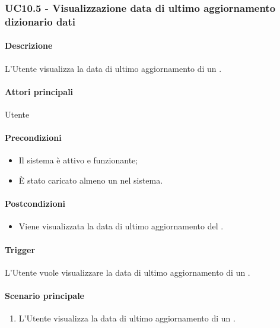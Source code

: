 
\subsubsection{UC10.5 - Visualizzazione data di ultimo aggiornamento dizionario dati}\label{UC10point5}
\paragraph*{Descrizione}
L'Utente visualizza la data di ultimo aggiornamento di un .

\paragraph*{Attori principali}
Utente

\paragraph*{Precondizioni}
\begin{itemize}
  \item Il sistema è attivo e funzionante;
  \item È stato caricato almeno un  nel sistema. 
\end{itemize}

\paragraph*{Postcondizioni}
\begin{itemize}
  \item Viene visualizzata la data di ultimo aggiornamento del .
\end{itemize}

\paragraph*{Trigger}
L'Utente vuole visualizzare la data di ultimo aggiornamento di un .

\paragraph*{Scenario principale}
\begin{enumerate}
  \item L'Utente visualizza la data di ultimo aggiornamento di un .
\end{enumerate}